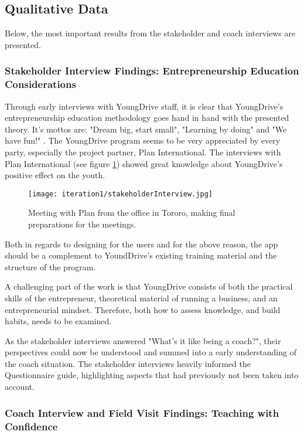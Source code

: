 \subsection{Qualitative Data}

Below, the most important results from the stakeholder and coach interviews are presented.

\subsubsection{Stakeholder Interview Findings: Entrepreneurship Education Considerations}
Through early interviews with YoungDrive staff, it is clear that YoungDrive's entrepreneurship education methodology goes hand in hand with the presented theory. It's mottos are: "Dream big, start small", "Learning by doing" and "We have fun!" \citep{youngdrive-manual}. The YoungDrive program seems to be very appreciated by every party, especially the project partner, Plan International. The interviews with Plan International (see figure \ref{fig:stakeholderInterview}) showed great knowledge about YoungDrive's positive effect on the youth.

\begin{figure}[h]
  \centering
  \texttt{[image: iteration1/stakeholderInterview.jpg]}
  \caption{Meeting with Plan from the office in Tororo, making final preparations for the meetings.}
  \label{fig:stakeholderInterview}
\end{figure}

Both in regards to designing for the users and for the above reason, the app should be a complement to YoundDrive's existing training material and the structure of the program.

A challenging part of the work is that YoungDrive consists of both the practical skills of the entrepreneur, theoretical material of running a business, and an entrepreneurial mindset. Therefore, both how to assess knowledge, and build habits, needs to be examined.

As the stakeholder interviews answered "What's it like being a coach?", their perspectives could now be understood and summed into a early understanding of the coach situation. The stakeholder interviews heavily informed the Questionnaire guide, highlighting aspects that had previously not been taken into account.

\subsubsection{Coach Interview and Field Visit Findings: Teaching with Confidence}

